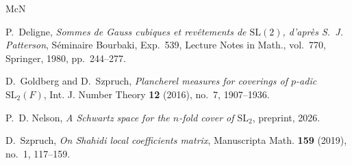 \documentclass[reqno]{amsart}
\numberwithin{equation}{section}
\theoremstyle{definition}
\theoremstyle{plain}
\begin{document}
\begin{thebibliography}{McN}

P.~Deligne, \emph{Sommes de {G}auss cubiques et rev\^etements de {$\mathrm{SL}(2)$}, d'apr\`es {S}.~{J}. {P}atterson}, S\'eminaire Bourbaki, Exp.~539, Lecture Notes in Math., vol.~770, Springer, 1980, pp.~244--277.

D.~Goldberg and D.~Szpruch, \emph{Plancherel measures for coverings of {$p$}-adic {$\mathrm{SL}_2(F)$}}, Int. J. Number Theory \textbf{12} (2016), no.~7, 1907--1936.

P.~D. Nelson, \emph{A {S}chwartz space for the $n$-fold cover of $\mathrm{SL}_2$}, preprint, 2026.

D.~Szpruch, \emph{On {S}hahidi local coefficients matrix}, Manuscripta Math. \textbf{159} (2019), no.~1, 117--159.

\end{thebibliography}
\end{document}
